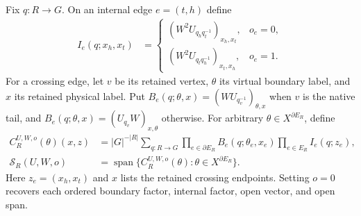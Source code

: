 \begin{definition}%
    \label{def:peps_oriented_open_coefficients}
    \leanok
    Fix $q:R\to G$. On an internal edge $e=(t,h)$ define
    \begin{align}
        I_e(q;x_h,x_t) & =
        \begin{cases}
            (W^2U_{q_hq_t^{-1}})_{x_h,x_t}, & o_e=0, \\
            (W^2U_{q_tq_h^{-1}})_{x_t,x_h}, & o_e=1.
        \end{cases}
        \label{eq:peps_oriented_internal}
    \end{align}
    For a crossing edge, let $v$ be its retained vertex, $\theta$ its
    virtual boundary label, and $x$ its retained physical label. Put
    $B_e(q;\theta,x)=(WU_{q_v^{-1}})_{\theta,x}$ when $v$ is the
    native tail, and $B_e(q;\theta,x)=(U_{q_v}W)_{x,\theta}$ otherwise.
    For arbitrary $\theta\in X^{\partial E_R}$, define
    \begin{align}
        C_R^{U,W,o}(\theta)(x,z)
         & =|G|^{-|R|}\sum_{q:R\to G}
        \prod_{e\in\partial E_R}B_e(q;\theta_e,x_e)
        \prod_{e\in E_R}I_e(q;z_e),
        \label{eq:peps_oriented_open}                 \\
        \mathcal S_R(U,W,o)
         & =\operatorname{span}\{C_R^{U,W,o}(\theta):
        \theta\in X^{\partial E_R}\}.
        \label{eq:peps_oriented_open_span}
    \end{align}
    Here $z_e=(x_h,x_t)$ and $x$ lists the retained crossing endpoints.
    Setting $o=0$ recovers each ordered boundary factor, internal factor,
    open vector, and open span.
\end{definition}


